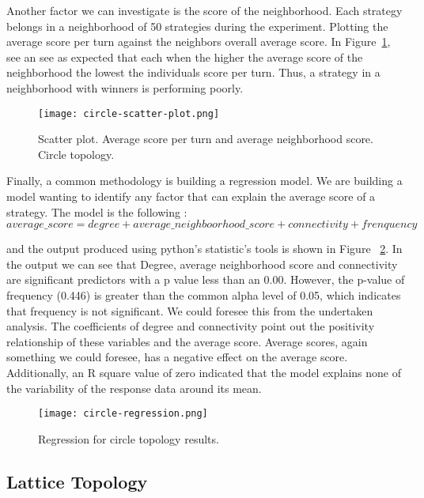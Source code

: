 \newpage

Another factor we can investigate is the score of the neighborhood. Each strategy
belongs in a neighborhood of 50 strategies during the experiment. Plotting
the average score per turn against the neighbors overall average score. In
Figure~\ref{fig:circle-scatter-plot}, see an see as expected that each when the
higher the average score of the neighborhood the lowest the individuals score
per turn. Thus, a strategy in a neighborhood with winners is performing poorly.

\begin{figure}[h!]
\centering
    \texttt{[image: circle-scatter-plot.png]}
    \caption{Scatter plot. Average score per turn and average neighborhood score.
             Circle topology.}
    \label{fig:circle-scatter-plot}
\end{figure}

Finally, a common methodology is building a regression model. We are building
a model wanting to identify any factor that can explain the average score of a
strategy. The model is the following :
\begin{equation}\label{regmodel}
average\_score = degree + average\_neighboorhood\_score + connectivity + frenquency
\end{equation}

and the output produced using python's statistic's tools is shown in Figure
~\ref{fig:circle-regression}. In the output we can see that Degree, average
neighborhood score and connectivity
are significant predictors with a p value less than an 0.00. However, the p-value
of frequency (0.446) is greater than the common alpha level of 0.05, which
indicates that frequency is not significant. We could foresee this from the undertaken
analysis. The coefficients of degree and connectivity point out the positivity
relationship of these variables and the average score. Average scores, again
something we could foresee, has a negative effect on the average score.
Additionally, an R square value of zero indicated that the model explains none of
the variability of the response data around its mean.

\begin{figure}[h!]
\centering
    \texttt{[image: circle-regression.png]}
    \caption{Regression for circle topology results.}
    \label{fig:circle-regression}
\end{figure}
\newpage

\subsection{Lattice Topology}
\label{sub:lattice}

